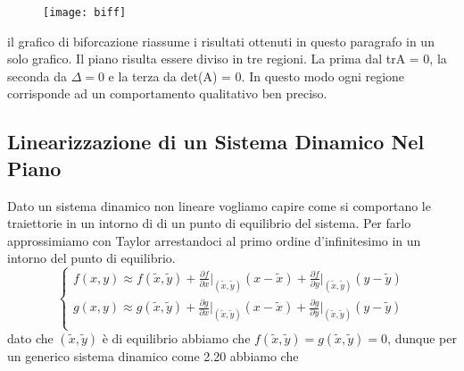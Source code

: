  
\begin{figure}[!ht]
\vspace{0.1in}
\texttt{[image: biff]}	
\centering
\end{figure}

il grafico di biforcazione riassume i risultati ottenuti in questo paragrafo in un solo grafico. Il piano risulta essere diviso in tre regioni. La prima dal trA = 0, la seconda da $\Delta = 0$ e la terza da det(A) = 0. In questo modo ogni regione corrisponde ad un comportamento qualitativo ben preciso.

\newpage

\subsection{Linearizzazione di un Sistema Dinamico Nel Piano}

Dato un sistema dinamico non lineare vogliamo capire come si comportano le traiettorie in un intorno di di un punto di equilibrio del sistema. Per farlo approssimiamo con Taylor arrestandoci al primo ordine d'infinitesimo in un intorno del punto di equilibrio.
\begin{equation*}
	\left \{ \begin{array}{l}
		f(x,y) \approx  f(\tilde{x},\tilde{y}) + \frac{\partial f}{\partial x}\big |_{(\tilde{x},\tilde{y})}(x-\tilde{x}) + \frac{\partial f}{\partial y}\big |_{(\tilde{x},\tilde{y})}(y-\tilde{y})\\[0.1in] 
		g(x,y) \approx  g(\tilde{x},\tilde{y}) + \frac{\partial g}{\partial x}\big |_{(\tilde{x},\tilde{y})}(x-\tilde{x}) + \frac{\partial g}{\partial y}\big |_{(\tilde{x},\tilde{y})}(y-\tilde{y})\\ 
	\end{array} \right.
\end{equation*}
dato che $(\tilde{x},\tilde{y})$ \`{e} di equilibrio abbiamo che $f(\tilde{x},\tilde{y}) = g(\tilde{x},\tilde{y}) = 0$, dunque per un generico sistema dinamico come 2.20 abbiamo che 

